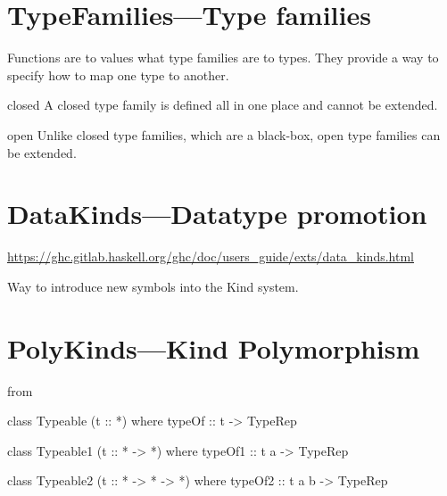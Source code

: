 \documentclass[openany, 12pt]{book}
\begin{document}
\setcounter{chapter}{9}
\chapter{TypeFamilies---Type families}
Functions are to values what type families are to types. They provide a way to
specify how to map one type to another.

\begin{definition}{closed}{}
	A closed type family is defined all in one place and cannot be extended.
\end{definition}

\begin{definition}{open}{}
	Unlike closed type families, which are a black-box, open type families can be extended.
\end{definition}


\chapter{DataKinds---Datatype promotion}
\url{https://ghc.gitlab.haskell.org/ghc/doc/users_guide/exts/data_kinds.html}

Way to introduce new symbols into the Kind system.

\setcounter{chapter}{13}
\chapter{PolyKinds---Kind Polymorphism}
from
\begin{haskell}{}
class Typeable (t :: *) where
    typeOf :: t -> TypeRep

class Typeable1 (t :: * -> *) where
    typeOf1 :: t a -> TypeRep

class Typeable2 (t :: * -> * -> *) where
    typeOf2 :: t a b -> TypeRep
\end{haskell}
\end{document}
